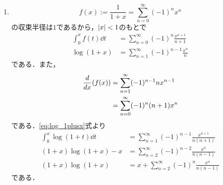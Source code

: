 



    
\maketitle

\begin{enumerate}[(1)]
    \item 
    \begin{equation}
        f(x):=\frac{1}{1+x}=\sum_{n=0}^{\infty} (-1)^nx^n
    \end{equation}
    の収束半径は$1$であるから，$\abs{x}<1$のもとで
    \begin{align}
        \int_0^x f(t)\dd{t}
        &=\sum_{n=0}^{\infty} (-1)^n\frac{x^{n+1}}{n+1}\\
        \log(1+x)
        &=\sum_{n=1}^{\infty} (-1)^{n-1}\frac{x^{n}}{n}\label{eq:log_1plusx}
    \end{align}
    である．また，
    \begin{align}
        \dv{x}(f(x))
        &=\sum_{n=1}^{\infty} (-1)^{n-1}nx^{n-1}\\
        &=\sum_{n=0}^{\infty} (-1)^{n}(n+1)x^{n}
    \end{align}
    である．\eqref{eq:log_1plusx}式より
    \begin{align}
        \int_0^x \log(1+t)\dd{t}
        &=\sum_{n=1}^{\infty} (-1)^{n-1}\frac{x^{n+1}}{n(n+1)}\\
        (1+x)\log(1+x)-x
        &=\sum_{n=2}^{\infty} (-1)^{n-2}\frac{x^{n}}{n(n-1)}\\
        (1+x)\log(1+x)
        &=x+\sum_{n=2}^{\infty} (-1)^{n}\frac{x^{n}}{n(n-1)}
    \end{align}
    である．
    

\end{enumerate}
